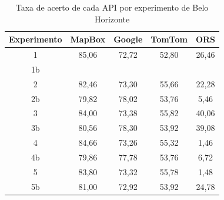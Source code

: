 \begin{table}[!ht]
\centering
\caption{Taxa de acerto de cada API por experimento de Belo Horizonte}
\label{tab:txRespExpAPIBH}
\begin{adjustbox}{width=0.7\textwidth}
\begin{tabular}{|c|c|c|c|c|}
\hline
Experimento & MapBox & Google & TomTom & ORS\\
\hline
1 & 85,06 & 72,72 & 52,80 & 26,46\\
\hline
1b &  &  &  & \\
\hline
2 & 82,46 & 73,30 & 55,66 & 22,28\\
\hline
2b & 79,82 & 78,02 & 53,76 & 5,46\\
\hline
3 & 84,00 & 73,38 & 55,82 & 40,06\\
\hline
3b & 80,56 & 78,30 & 53,92 & 39,08\\
\hline
4 & 84,66 & 73,26 & 55,32 & 1,46\\
\hline
4b & 79,86 & 77,78 & 53,76 & 6,72\\
\hline
5 & 83,80 & 73,32 & 55,78 & 1,48\\
\hline
5b & 81,00 & 72,92 & 53,92 & 24,78\\
\hline
\end{tabular}
\end{adjustbox}
\end{table}

